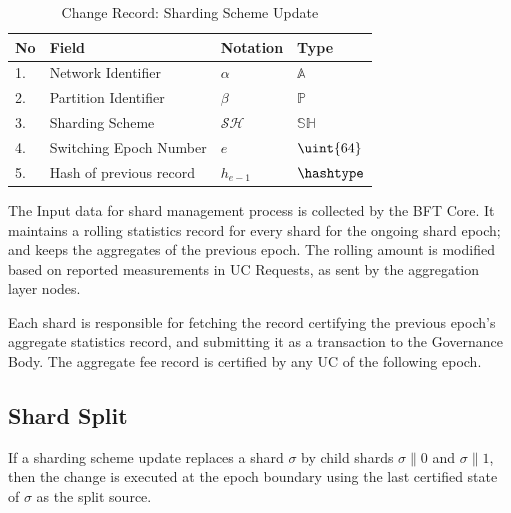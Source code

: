 \begin{table}[!htbp]
	\begin{center}
		\caption{Change Record: Sharding Scheme Update}\label{ta:ssu}
		\begin{tabular}{|p{0.5cm}|p{8cm}|p{1.7cm}|p{3.5cm}|}\hline
			No & Field                      & Notation       & Type          \\\hline\hline
			1. & Network Identifier         & $\alpha$       & $\mathbb{A}$  \\\hline
			2. & Partition Identifier       & $\beta$        & $\mathbb{P}$  \\\hline
			3. & Sharding Scheme            & $\mathcal{SH}$ & $\mathbb{SH}$ \\\hline
			4. & Switching Epoch Number     & $e$            & $\uint{64}$   \\\hline
			5. & Hash of previous record    & $h_{e-1}$      & $\hashtype$  \\\hline
		\end{tabular}
	\end{center}
\end{table}

The Input data for shard management process is collected by the BFT Core. It maintains a rolling statistics record for every shard for the ongoing shard epoch; and keeps the aggregates of the previous epoch. The rolling amount is modified based on reported measurements in UC Requests, as sent by the aggregation layer nodes.

Each shard is responsible for fetching the record certifying the previous epoch's aggregate statistics record, and submitting it as a transaction to the Governance Body. The aggregate fee record is certified by any UC of the following epoch.

\subsection{Shard Split}

If a sharding scheme update replaces a shard $\sigma$ by child shards $\sigma\|0$ and $\sigma\|1$, then the change is executed at the epoch boundary using the last certified state of $\sigma$ as the split source.

